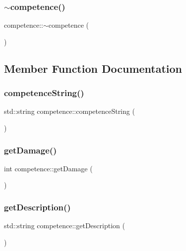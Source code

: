 \subsubsection{\texorpdfstring{$\sim$competence()}{~competence()}}
{\footnotesize\ttfamily competence\+::$\sim$competence (\begin{DoxyParamCaption}{ }\end{DoxyParamCaption})}



\subsection{Member Function Documentation}
\mbox{\label{classcompetence_a4acc4e02f7e8c49a6d4d1db307e8f03d}} 
\subsubsection{\texorpdfstring{competence\+String()}{competenceString()}}
{\footnotesize\ttfamily std\+::string competence\+::competence\+String (\begin{DoxyParamCaption}{ }\end{DoxyParamCaption})}

\mbox{\label{classcompetence_a752380fae93494815023b3a177e57f44}} 
\subsubsection{\texorpdfstring{get\+Damage()}{getDamage()}}
{\footnotesize\ttfamily int competence\+::get\+Damage (\begin{DoxyParamCaption}{ }\end{DoxyParamCaption})}

\mbox{\label{classcompetence_ae0980a623fb74c32a630400cdb56cd14}} 
\subsubsection{\texorpdfstring{get\+Description()}{getDescription()}}
{\footnotesize\ttfamily std\+::string competence\+::get\+Description (\begin{DoxyParamCaption}{ }\end{DoxyParamCaption})}

